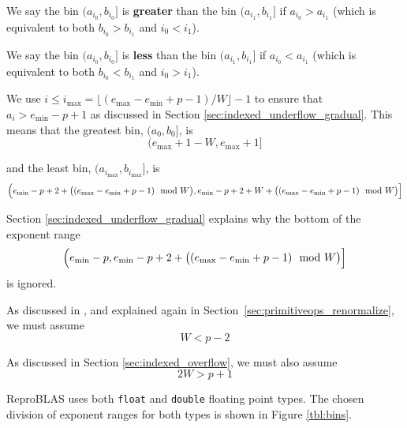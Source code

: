     We say the bin $(a_{i_0}, b_{i_0}]$ is \textbf{greater} than the bin
    $(a_{i_1}, b_{i_1}]$ if $a_{i_0} > a_{i_1}$ (which is equivalent to both
    $b_{i_0} > b_{i_1}$ and $i_0 < i_1$).

    We say the bin $(a_{i_0}, b_{i_0}]$ is \textbf{less} than the bin
    $(a_{i_1}, b_{i_1}]$ if $a_{i_0} < a_{i_1}$ (which is equivalent to both
    $b_{i_0} < b_{i_1}$ and $i_0 > i_1$).

    We use $i \leq i_{\max} = \lfloor(e_{\max} - e_{\min} + p - 1)/W\rfloor - 1$
    to ensure that $a_i > e_{\min} - p + 1$ as discussed in Section
    \ref{sec:indexed_underflow_gradual}. This means that the greatest bin,
    $(a_{0}, b_{0}]$, is
    \begin{equation}
      (e_{\max} + 1 - W, e_{\max} + 1]
      \label{eq:binmax}
    \end{equation}

    and the least bin, $(a_{i_{\max}}, b_{i_{\max}}]$, is
    \begin{equation}
      \Bigl(e_{\min} - p + 2 + \bigl((e_{\max} - e_{\min} + p - 1)\mod W\bigr),
      e_{\min} - p + 2 + W + \bigl((e_{\max} - e_{\min} + p - 1)\mod W\bigr)\Bigr]
      \label{eq:binmin}
    \end{equation}

    Section \ref{sec:indexed_underflow_gradual} explains why the bottom of the exponent range
    \begin{equation*}
    \Bigl(e_{\min} - p, e_{\min} - p + 2 + \bigl((e_{\max} - e_{\min} + p - 1) \mod W\bigr)\Bigr]
    \end{equation*}
    is ignored.

    As discussed in \cite{repsum}, and explained again in Section~\ref{sec:primitiveops_renormalize},
    we must assume
    \begin{equation}
      W < p - 2
      \label{eq:wupper}
    \end{equation}

    As discussed in Section \ref{sec:indexed_overflow}, we must also assume
    \begin{equation}
      2 W > p + 1
      \label{eq:wlower}
    \end{equation}

    ReproBLAS uses both \texttt{float} and \texttt{double} floating point
    types. The chosen division of exponent ranges for both types is shown in
    Figure \ref{tbl:bins}.


